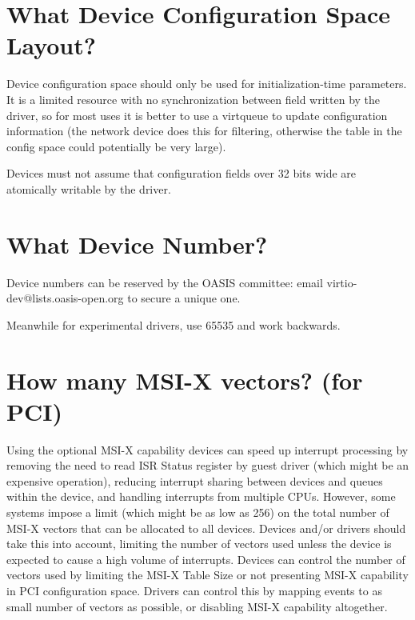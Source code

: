 \section{What Device Configuration Space Layout?}\label{sec:Creating New Device Types / What Device Configuration Space Layout?}

Device configuration space should only be used for initialization-time
parameters.  It is a limited resource with no synchronization between
field written by the driver, so for most uses it is better to use a virtqueue to update
configuration information (the network device does this for filtering,
otherwise the table in the config space could potentially be very
large).

Devices must not assume that configuration fields over 32 bits wide
are atomically writable by the driver.

\section{What Device Number?}\label{sec:Creating New Device Types / What Device Number?}

Device numbers can be reserved by the OASIS committee: email
virtio-dev@lists.oasis-open.org to secure a unique one.

Meanwhile for experimental drivers, use 65535 and work backwards.

\section{How many MSI-X vectors?  (for PCI)}\label{sec:Creating New Device Types / How many MSI-X vectors?  (for PCI)}

Using the optional MSI-X capability devices can speed up
interrupt processing by removing the need to read ISR Status
register by guest driver (which might be an expensive operation),
reducing interrupt sharing between devices and queues within the
device, and handling interrupts from multiple CPUs. However, some
systems impose a limit (which might be as low as 256) on the
total number of MSI-X vectors that can be allocated to all
devices. Devices and/or drivers should take this into
account, limiting the number of vectors used unless the device is
expected to cause a high volume of interrupts. Devices can
control the number of vectors used by limiting the MSI-X Table
Size or not presenting MSI-X capability in PCI configuration
space. Drivers can control this by mapping events to as small
number of vectors as possible, or disabling MSI-X capability
altogether.


